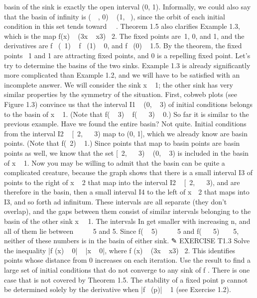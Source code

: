 \documentclass{article}
\begin{document}
basin of the sink is exactly the open interval (0, 1). Informally, we could also
say that the basin of infinity is (  , 0)   (1,  ), since the orbit of each initial
condition in this set tends toward   .
Theorem 1.5 also clarifies Example 1.3, which is the map f(x)   (3x  
x3)  2. The fixed points are 1, 0, and 1, and the derivatives are f  ( 1)   f  (1)  
0, and f  (0)   1.5. By the theorem, the fixed points  1 and 1 are attracting fixed
points, and 0 is a repelling fixed point.
Let’s try to determine the basins of the two sinks. Example 1.3 is already
significantly more complicated than Example 1.2, and we will have to be satisfied
with an incomplete answer. We will consider the sink x   1; the other sink has
very similar properties by the symmetry of the situation.
First, cobweb plots (see Figure 1.3) convince us that the interval I1  
(0,
 
3) of initial conditions belongs to the basin of x   1. (Note that f(
 
3)  
f( 
 
3)   0.) So far it is similar to the previous example. Have we found the
entire basin? Not quite. Initial conditions from the interval I2   [ 2, 
 
3)
map to (0, 1], which we already know are basin points. (Note that f( 2)   1.)
Since points that map to basin points are basin points as well, we know that the
set [ 2, 
 
3)   (0,
 
3) is included in the basin of x   1. Now you may be
willing to admit that the basin can be quite a complicated creature, because the
graph shows that there is a small interval I3 of points to the right of x   2 that
map into the interval I2   [ 2, 
 
3), and are therefore in the basin, then a
small interval I4 to the left of x  2 that maps into I3, and so forth ad infinitum.
These intervals are all separate (they don’t overlap), and the gaps between them
consist of similar intervals belonging to the basin of the other sink x   1. The
intervals In get smaller with increasing n, and all of them lie between  
 
  5 and
5. Since f(
 
5)    
 
5 and f( 
 
5)  
 
5, neither of these numbers is in
the basin of either sink.
✎ EXERCISE T1.3
Solve the inequality |f (x)   0|   |x   0|, where f (x)   (3x   x3)  2. This
identifies points whose distance from 0 increases on each iteration. Use
the result to find a large set of initial conditions that do not converge to
any sink of f .
There is one case that is not covered by Theorem 1.5. The stability of a
fixed point p cannot be determined solely by the derivative when |f  (p)|   1 (see
Exercise 1.2).
\end{document}
